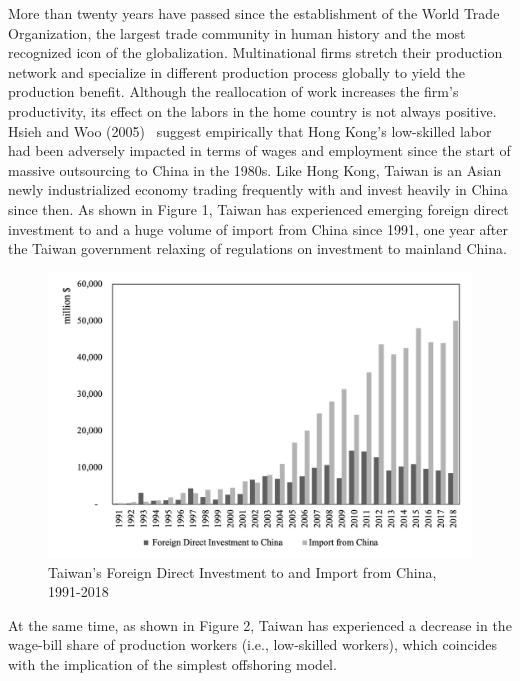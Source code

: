 \documentclass{article}
\begin{document}
More than twenty years have passed since the establishment of the World Trade Organization, the largest trade community in human history and the most recognized icon of the globalization. Multinational firms stretch their production network and specialize in different production process globally to yield the production benefit. Although the reallocation of work increases the firm’s productivity, its effect on the labors in the home country is not always positive. Hsieh and Woo (2005)~\cite{hsieh2005impact} suggest empirically that Hong Kong’s low-skilled labor had been adversely impacted in terms of wages and employment since the start of massive outsourcing to China in the 1980s. Like Hong Kong, Taiwan is an Asian newly industrialized economy trading frequently with and invest heavily in China since then. As shown in Figure 1, Taiwan has experienced emerging foreign direct investment to and a huge volume of import from China since 1991, one year after the Taiwan government relaxing of regulations on investment to mainland China.\par 
\begin{figure}
\centering
\includegraphics[width=1\textwidth]{figure1.png}
\caption{\label{fig:1}Taiwan's Foreign Direct Investment to and Import from China, 1991-2018}
\end{figure}
At the same time, as shown in Figure 2, Taiwan has experienced a decrease in the wage-bill share of production workers (i.e., low-skilled workers), which coincides with the implication of the simplest offshoring model. 
\end{document}
